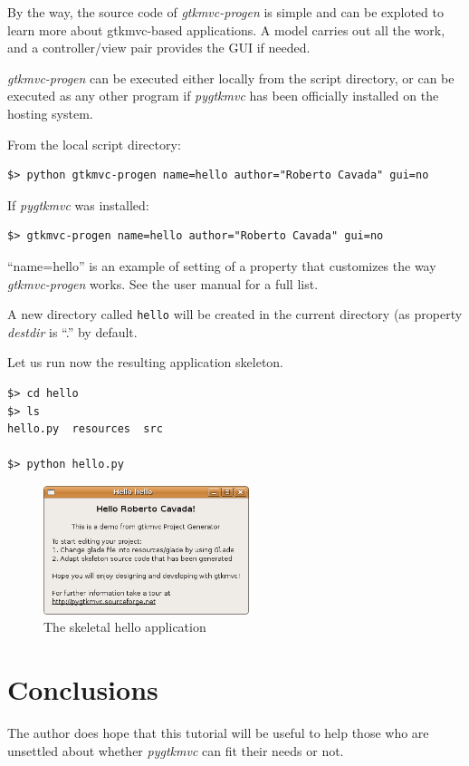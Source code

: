 \documentclass{article}
\newcommand{\kw}[1]{\emph{#1}\xspace}
\newcommand{\pygtkmvc}{\kw{pygtkmvc}}
\newcommand{\file}[1]{\texttt{#1}\xspace}
\begin{document}
By the way, the source code of \kw{gtkmvc-progen} is simple and can
be exploted to learn more about gtkmvc-based applications. A model
carries out all the work, and a controller/view pair provides the
GUI if needed.

\kw{gtkmvc-progen} can be executed either locally from the script
directory, or can be executed as any other program if \pygtkmvc has
been officially installed on the hosting system.

From the local script directory:
\begin{verbatim}
$> python gtkmvc-progen name=hello author="Roberto Cavada" gui=no
\end{verbatim}

If \pygtkmvc was installed:
\begin{verbatim}
$> gtkmvc-progen name=hello author="Roberto Cavada" gui=no
\end{verbatim}

``name=hello'' is an example of setting of a property that customizes the
way \kw{gtkmvc-progen} works. See the user manual for a full list. 

A new directory called \file{hello} will be created in the current
directory (as property \kw{destdir} is ``.'' by default. 

Let us run now the resulting application skeleton.

\begin{verbatim}
$> cd hello
$> ls
hello.py  resources  src

$> python hello.py
\end{verbatim}


\begin{figure}[htbp]
\begin{center}
\includegraphics[width=6cm]{png/hello.png}
\caption{\label{fig:hello}The skeletal hello application}
\end{center}
\end{figure}


\section{Conclusions}
The author does hope that this tutorial will be useful to help those
who are unsettled about whether \pygtkmvc can fit their needs or not.
\end{document}
